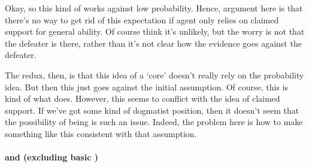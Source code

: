 \begin{note}
  Okay, so this kind of works against low probability.
  Hence, argument here is that there's no way to get rid of this expectation if agent only relies on claimed support for general ability.
  Of course think it's unlikely, but the worry is not that the defeater is there, rather than it's not clear how the evidence goes against the defeater.

  The redux, then, is that this idea of a `core' doesn't really rely on the probability idea.
  But then this just goes against the initial assumption.
  Of course, this is kind of what \citeauthor{Pryor:2000tl} does.
  However, this seems to conflict with the idea of claimed support.
  If we've got some kind of dogmatist position, then it doesn't seem that the possibility of being \mom{} is such an issue.
  Indeed, the problem here is how to make something like this consistent with that assumption.
\end{note}

\paragraph{\nI{} and \adB{} (excluding basic \AR{})}
\label{sec:ni-ability:adB}

